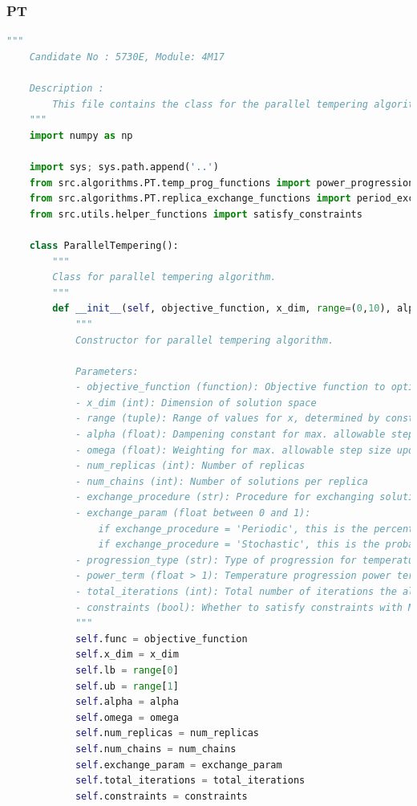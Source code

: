 \documentclass[10pt]{article}
\begin{document}
\subsubsection{PT}
\label{sec:PT}
\begin{lstlisting}[language=Python, caption=PT.py, label=PTpy]
    """
    Candidate No : 5730E, Module: 4M17 
    
    Description :
        This file contains the class for the parallel tempering algorithm.
    """
    import numpy as np
    
    import sys; sys.path.append('..')
    from src.algorithms.PT.temp_prog_functions import power_progression, geometric_progression
    from src.algorithms.PT.replica_exchange_functions import period_exchange, stochastic_exchange, always_exchange
    from src.utils.helper_functions import satisfy_constraints
    
    class ParallelTempering():
        """
        Class for parallel tempering algorithm.  
        """
        def __init__(self, objective_function, x_dim, range=(0,10), alpha=0.1, omega=2.1, num_replicas=10, num_chains=25, exchange_procedure='Periodic', exchange_param=0.2, schedule_type='Power', power_term=1, total_iterations=100, constraints=True):
            """
            Constructor for parallel tempering algorithm.
    
            Parameters:
            - objective_function (function): Objective function to optimise
            - x_dim (int): Dimension of solution space
            - range (tuple): Range of values for x, determined by constraints of problem
            - alpha (float): Dampening constant for max. allowable step size update
            - omega (float): Weighting for max. allowable step size update
            - num_replicas (int): Number of replicas
            - num_chains (int): Number of solutions per replica
            - exchange_procedure (str): Procedure for exchanging solutions between replicas
            - exchange_param (float between 0 and 1): 
                if exchange_procedure = 'Periodic', this is the percentage of iterations after which to exchange solutions
                if exchange_procedure = 'Stochastic', this is the probability of exchanging solutions between replicas during each iteration
            - progression_type (str): Type of progression for temperature scheduling
            - power_term (float > 1): Temperature progression power term, if using power progression. Schedule is (i/N)^power_term
            - total_iterations (int): Total number of iterations the algorithm will run for
            - constraints (bool): Whether to satisfy constraints with Metropolis criterion or not
            """
            self.func = objective_function
            self.x_dim = x_dim
            self.lb = range[0] 
            self.ub = range[1]
            self.alpha = alpha
            self.omega = omega 
            self.num_replicas = num_replicas
            self.num_chains = num_chains
            self.exchange_param = exchange_param
            self.total_iterations = total_iterations
            self.constraints = constraints
    

\end{lstlisting}
\end{document}
